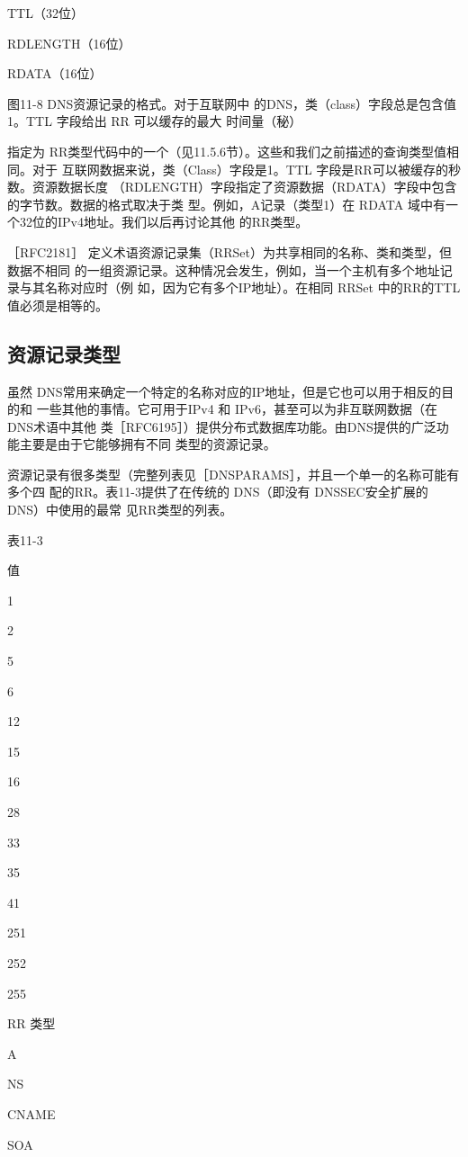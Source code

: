 TTL（32位）

RDLENGTH（16位）

RDATA（16位）

图11-8 DNS资源记录的格式。对于互联网中
的DNS，类（class）字段总是包含值
1。TTL 字段给出 RR 可以缓存的最大
时间量（秘）

指定为 RR类型代码中的一个（见11.5.6节）。这些和我们之前描述的查询类型值相同。对于
互联网数据来说，类（Class）字段是1。TTL 字段是RR可以被缓存的秒数。资源数据长度
（RDLENGTH）字段指定了资源数据（RDATA）字段中包含的字节数。数据的格式取决于类
型。例如，A记录（类型1）在 RDATA 域中有一个32位的IPv4地址。我们以后再讨论其他
的RR类型。

［RFC2181］ 定义术语资源记录集（RRSet）为共享相同的名称、类和类型，但数据不相同
的一组资源记录。这种情况会发生，例如，当一个主机有多个地址记录与其名称对应时（例
如，因为它有多个IP地址）。在相同 RRSet 中的RR的TTL 值必须是相等的。

\subsection{资源记录类型}

虽然 DNS常用来确定一个特定的名称对应的IP地址，但是它也可以用于相反的目的和
一些其他的事情。它可用于IPv4 和 IPv6，甚至可以为非互联网数据（在 DNS术语中其他
类［RFC6195］）提供分布式数据库功能。由DNS提供的广泛功能主要是由于它能够拥有不同
类型的资源记录。

资源记录有很多类型（完整列表见［DNSPARAMS］，并且一个单一的名称可能有多个四
配的RR。表11-3提供了在传统的 DNS（即没有 DNSSEC安全扩展的 DNS）中使用的最常
见RR类型的列表。

表11-3

值

1

2

5

6

12

15

16

28

33

35

41

251

252

255

RR 类型

A

NS

CNAME

SOA

